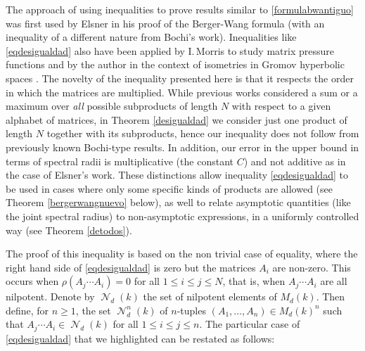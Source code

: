 \documentclass[11pt]{article}
\let\mathcal\mathscr
\theoremstyle{plain}
\theoremstyle{definition}
\DeclareMathOperator{\Nil}{\mathcal{N}}
\begin{document}
The approach of using inequalities to prove results similar to \eqref{formulabwantiguo} was first used by Elsner \cite{elsner} in his proof of the Berger-Wang formula (with an inequality of a different nature from Bochi's work). Inequalities like \eqref{eqdesigualdad} also have been applied by I.\,Morris to study matrix pressure functions \cite{morrispr} and by the author in the context of isometries in Gromov hyperbolic spaces \cite{yo}. The novelty of the inequality presented here is that it respects the order in which the matrices are multiplied. While previous works considered a sum or a maximum over \textit{all} possible subproducts of length $N$ with respect to a given alphabet of matrices, in Theorem \ref{desigualdad} we consider just one product of length $N$ together with its subproducts, hence our inequality does not follow from previously known Bochi-type results. In addition, our error in the upper bound in terms of spectral radii is multiplicative (the constant $C$) and not additive as in the case of Elsner's work. These distinctions allow inequality \eqref{eqdesigualdad} to be used in cases where only some specific kinds of products are allowed (see Theorem \ref{bergerwangnuevo} below), as well to relate asymptotic quantities (like the joint spectral radius) to non-asymptotic expressions, in a uniformly controlled way (see Theorem \ref{detodos}).

The proof of this inequality is based on the non trivial case of equality, where the right hand side of \eqref{eqdesigualdad} is zero but the matrices $A_i$ are non-zero. This occurs when $\rho(A_{j}\cdots A_{i})=0$ for all $1\leq i \leq j \leq N$, that is, when $A_{j}\cdots A_{i}$ are all nilpotent. Denote by $\Nil_{d}(k)$ the set of nilpotent elements of $M_{d}(k)$. Then define, for $n\geq 1$, the set $\Nil_{d}^{n}(k)$ of $n$-tuples $(A_1,\dots,A_n)\in {M_{d}(k)}^{n}$ such that $A_{j}\cdots A_{i}\in \Nil_{d}(k)$ for all $1\leq i \leq j \leq n$.
The particular case of \eqref{eqdesigualdad} that we highlighted can be restated as follows:
\end{document}
